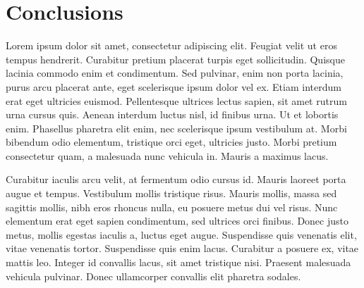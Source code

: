 \section{Conclusions}
Lorem ipsum dolor sit amet, consectetur adipiscing elit. 
Feugiat velit ut eros tempus hendrerit.
Curabitur pretium placerat turpis eget sollicitudin.
Quisque lacinia commodo enim et condimentum.
Sed pulvinar, enim non porta lacinia, purus arcu placerat ante, eget scelerisque ipsum dolor vel ex.
Etiam interdum erat eget ultricies euismod.
Pellentesque ultrices lectus sapien, sit amet rutrum urna cursus quis.
Aenean interdum luctus nisl, id finibus urna.
Ut et lobortis enim.
Phasellus pharetra elit enim, nec scelerisque ipsum vestibulum at.
Morbi bibendum odio elementum, tristique orci eget, ultricies justo.
Morbi pretium consectetur quam, a malesuada nunc vehicula in.
Mauris a maximus lacus.


Curabitur iaculis arcu velit, at fermentum odio cursus id.
Mauris laoreet porta augue et tempus.
Vestibulum mollis tristique risus.
Mauris mollis, massa sed sagittis mollis, nibh eros rhoncus nulla, eu posuere metus dui vel risus.
Nunc elementum erat eget sapien condimentum, sed ultrices orci finibus.
Donec justo metus, mollis egestas iaculis a, luctus eget augue.
Suspendisse quis venenatis elit, vitae venenatis tortor.
Suspendisse quis enim lacus.
Curabitur a posuere ex, vitae mattis leo.
Integer id convallis lacus, sit amet tristique nisi.
Praesent malesuada vehicula pulvinar.
Donec ullamcorper convallis elit pharetra sodales.

